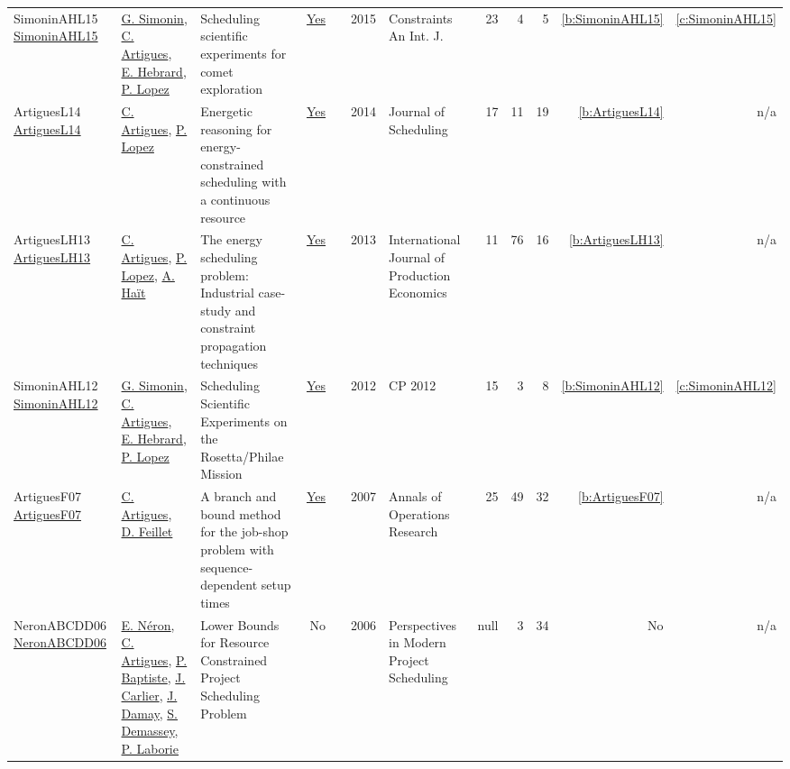 {\begin{longtable}{>{\raggedright\arraybackslash}p{3cm}>{\raggedright\arraybackslash}p{6cm}>{\raggedright\arraybackslash}p{6.5cm}rrrp{2.5cm}rrrrr}
SimoninAHL15 \href{https://doi.org/10.1007/s10601-014-9169-3}{SimoninAHL15} & \hyperref[auth:a127]{G. Simonin}, \hyperref[auth:a6]{C. Artigues}, \hyperref[auth:a1]{E. Hebrard}, \hyperref[auth:a3]{P. Lopez} & Scheduling scientific experiments for comet exploration & \href{../works/SimoninAHL15.pdf}{Yes} & \cite{SimoninAHL15} & 2015 & Constraints An Int. J. & 23 & 4 & 5 & \ref{b:SimoninAHL15} & \ref{c:SimoninAHL15}\\
ArtiguesL14 \href{http://dx.doi.org/10.1007/s10951-014-0404-y}{ArtiguesL14} & \hyperref[auth:a6]{C. Artigues}, \hyperref[auth:a3]{P. Lopez} & Energetic reasoning for energy-constrained scheduling with a continuous resource & \href{../works/ArtiguesL14.pdf}{Yes} & \cite{ArtiguesL14} & 2014 & Journal of Scheduling & 17 & 11 & 19 & \ref{b:ArtiguesL14} & n/a\\
ArtiguesLH13 \href{http://dx.doi.org/10.1016/j.ijpe.2010.09.030}{ArtiguesLH13} & \hyperref[auth:a6]{C. Artigues}, \hyperref[auth:a3]{P. Lopez}, \hyperref[auth:a1180]{A. Haït} & The energy scheduling problem: Industrial case-study and constraint propagation techniques & \href{../works/ArtiguesLH13.pdf}{Yes} & \cite{ArtiguesLH13} & 2013 & International Journal of Production Economics & 11 & 76 & 16 & \ref{b:ArtiguesLH13} & n/a\\
SimoninAHL12 \href{https://doi.org/10.1007/978-3-642-33558-7_5}{SimoninAHL12} & \hyperref[auth:a127]{G. Simonin}, \hyperref[auth:a6]{C. Artigues}, \hyperref[auth:a1]{E. Hebrard}, \hyperref[auth:a3]{P. Lopez} & Scheduling Scientific Experiments on the Rosetta/Philae Mission & \href{../works/SimoninAHL12.pdf}{Yes} & \cite{SimoninAHL12} & 2012 & CP 2012 & 15 & 3 & 8 & \ref{b:SimoninAHL12} & \ref{c:SimoninAHL12}\\
ArtiguesF07 \href{http://dx.doi.org/10.1007/s10479-007-0283-0}{ArtiguesF07} & \hyperref[auth:a6]{C. Artigues}, \hyperref[auth:a359]{D. Feillet} & A branch and bound method for the job-shop problem with sequence-dependent setup times & \href{../works/ArtiguesF07.pdf}{Yes} & \cite{ArtiguesF07} & 2007 & Annals of Operations Research & 25 & 49 & 32 & \ref{b:ArtiguesF07} & n/a\\
NeronABCDD06 \href{http://dx.doi.org/10.1007/978-0-387-33768-5_7}{NeronABCDD06} & \hyperref[auth:a906]{E. Néron}, \hyperref[auth:a6]{C. Artigues}, \hyperref[auth:a163]{P. Baptiste}, \hyperref[auth:a852]{J. Carlier}, \hyperref[auth:a907]{J. Damay}, \hyperref[auth:a245]{S. Demassey}, \hyperref[auth:a118]{P. Laborie} & Lower Bounds for Resource Constrained Project Scheduling Problem & No & \cite{NeronABCDD06} & 2006 & Perspectives in Modern Project Scheduling & null & 3 & 34 & No & n/a\\

\end{longtable}}
